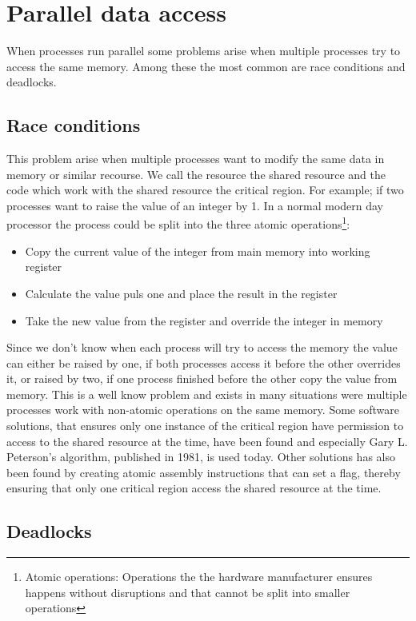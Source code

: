\section{Parallel data access}
When processes run parallel some problems arise when multiple processes try to access the same memory. Among these the most common are race conditions and deadlocks.

\subsection{Race conditions}
This problem arise when multiple processes want to modify the same data in memory or similar recourse. We call the resource the shared resource and the code which work with the shared resource the critical region. For example; if two processes want to raise the value of an integer by 1. In a normal modern day processor the process could be split into the three atomic operations\footnote{Atomic operations: Operations the the hardware manufacturer ensures happens without disruptions and that cannot be split into smaller operations}:
\begin{itemize}
\item Copy the current value of the integer from main memory into working register
\item Calculate the value puls one and place the result in the register
\item Take the new value from the register and override the integer in memory
\end{itemize}
Since we don't know when each process will try to access the memory the value can either be raised by one, if both processes access it before the other overrides it, or raised by two, if one process finished before the other copy the value from memory. This is a well know problem and exists in many situations were multiple processes work with non-atomic operations on the same memory. Some software solutions, that ensures only one instance of the critical region have permission to access to the shared resource at the time, have been found and especially Gary L. Peterson's algorithm, published in 1981, is used today. Other solutions has also been found by creating atomic assembly instructions that can set a flag, thereby ensuring that only one critical region access the shared resource at the time.

\subsection{Deadlocks}